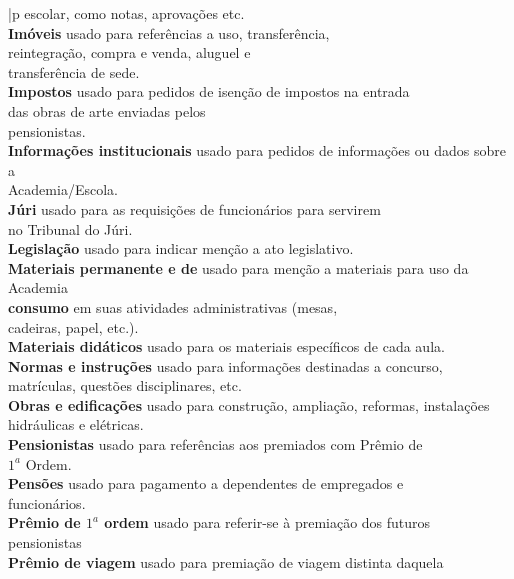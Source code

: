 \begin{tabbing}{|p}
	\>\> \> escolar, como notas, aprovações etc.\\
	\textbf{Imóveis} \>\>usado para \> referências a uso, transferência,\\
	\>\> \> reintegração, compra e venda, aluguel e\\
	\>\> \> transferência de sede.\\
	\textbf{Impostos} \>\>usado para \> pedidos de isenção de impostos na entrada\\
	\>\> \> das obras de arte enviadas pelos\\
	\>\> \> pensionistas.\\
	\textbf{Informações institucionais} \>\>usado para \> pedidos de informações ou dados sobre a\\
	\>\> \> Academia/Escola.\\
	\textbf{Júri} \>\>usado para \> as requisições de funcionários para servirem\\
	\>\> \> no Tribunal do Júri.\\
	\textbf{Legislação} \>\>usado para \> indicar menção a ato legislativo.\\
	\textbf{Materiais permanente e de} \>\>usado para \> menção a materiais para uso da Academia\\
	\textbf{consumo}\>\> \> em suas atividades administrativas (mesas,\\
	\>\> \> cadeiras, papel, etc.).\\
	\textbf{Materiais didáticos} \>\>usado para \> os materiais específicos de cada aula.\\
	\textbf{Normas e instruções} \>\>usado para \> informações destinadas a concurso,\\
	\>\> \> matrículas, questões disciplinares, etc.\\
	\textbf{Obras e edificações} \>\>usado para \> construção, ampliação, reformas, instalações\\
	\>\> \> hidráulicas e elétricas.\\
	\textbf{Pensionistas} \>\>usado para \> referências aos premiados com Prêmio de\\
	\>\> \> $1^a$ Ordem.\\
	\textbf{Pensões} \>\>usado para \> pagamento a dependentes de empregados e\\
	\>\> \> funcionários.\\
	\textbf{Prêmio de $1^a$ ordem} \>\>usado para \> referir-se à premiação dos futuros\\
	\>\> \> pensionistas\\
	\textbf{Prêmio de viagem} \>\>usado para \> premiação de viagem distinta daquela\\

\end{tabbing}
